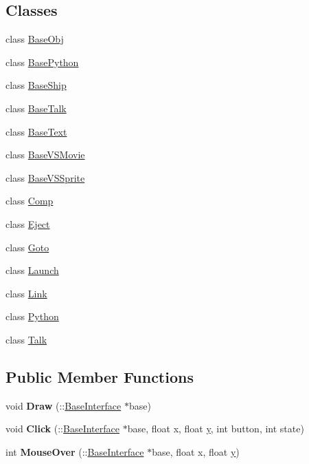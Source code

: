 \subsection*{Classes}
\begin{DoxyCompactItemize}
\item 
class \hyperlink{classBaseInterface_1_1Room_1_1BaseObj}{Base\+Obj}
\item 
class \hyperlink{classBaseInterface_1_1Room_1_1BasePython}{Base\+Python}
\item 
class \hyperlink{classBaseInterface_1_1Room_1_1BaseShip}{Base\+Ship}
\item 
class \hyperlink{classBaseInterface_1_1Room_1_1BaseTalk}{Base\+Talk}
\item 
class \hyperlink{classBaseInterface_1_1Room_1_1BaseText}{Base\+Text}
\item 
class \hyperlink{classBaseInterface_1_1Room_1_1BaseVSMovie}{Base\+V\+S\+Movie}
\item 
class \hyperlink{classBaseInterface_1_1Room_1_1BaseVSSprite}{Base\+V\+S\+Sprite}
\item 
class \hyperlink{classBaseInterface_1_1Room_1_1Comp}{Comp}
\item 
class \hyperlink{classBaseInterface_1_1Room_1_1Eject}{Eject}
\item 
class \hyperlink{classBaseInterface_1_1Room_1_1Goto}{Goto}
\item 
class \hyperlink{classBaseInterface_1_1Room_1_1Launch}{Launch}
\item 
class \hyperlink{classBaseInterface_1_1Room_1_1Link}{Link}
\item 
class \hyperlink{classBaseInterface_1_1Room_1_1Python}{Python}
\item 
class \hyperlink{classBaseInterface_1_1Room_1_1Talk}{Talk}
\end{DoxyCompactItemize}
\subsection*{Public Member Functions}
\begin{DoxyCompactItemize}
\item 
void {\bfseries Draw} (\+::\hyperlink{classBaseInterface}{Base\+Interface} $\ast$base)\hypertarget{classBaseInterface_1_1Room_a4600ac74cd38c6c46f3b3a38b73c9453}{}\label{classBaseInterface_1_1Room_a4600ac74cd38c6c46f3b3a38b73c9453}

\item 
void {\bfseries Click} (\+::\hyperlink{classBaseInterface}{Base\+Interface} $\ast$base, float x, float \hyperlink{IceUtils_8h_aa7ffaed69623192258fb8679569ff9ba}{y}, int button, int state)\hypertarget{classBaseInterface_1_1Room_a389d4689bd253c8652201613ffbc468d}{}\label{classBaseInterface_1_1Room_a389d4689bd253c8652201613ffbc468d}

\item 
int {\bfseries Mouse\+Over} (\+::\hyperlink{classBaseInterface}{Base\+Interface} $\ast$base, float x, float \hyperlink{IceUtils_8h_aa7ffaed69623192258fb8679569ff9ba}{y})\hypertarget{classBaseInterface_1_1Room_a4510edfee6c310164fa448ed6b9bbfb3}{}\label{classBaseInterface_1_1Room_a4510edfee6c310164fa448ed6b9bbfb3}

\end{DoxyCompactItemize}
